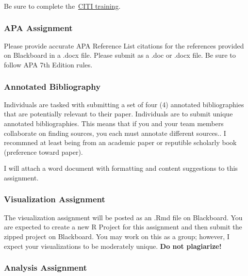 \documentclass[
  b5paper]{book}
\begin{document}
Be sure to complete the~\href{https://www.citiprogram.org/Shibboleth.sso/Login?target=https\%3A\%2F\%2Fwww.citiprogram.org\%2FSecure\%2FWelcome.cfm?inst=551\&entityID=https\%3A\%2F\%2Fsts.windows.net\%2F99f37d21-0b5c-43ea-9103-e16f02f5aecf\%2F}{CITI training}.

\hypertarget{apa-assignment}{%
\subsubsection*{APA Assignment}\label{apa-assignment}}

Please provide accurate APA Reference List citations for the references provided on Blackboard in a .docx file. Please submit as a .doc or .docx file. Be sure to follow APA 7th Edition rules.

\hypertarget{annotated-bibliography}{%
\subsubsection*{Annotated Bibliography}\label{annotated-bibliography}}

Individuals are tasked with submitting a set of four (4) annotated bibliographies that are potentially relevant to their paper. Individuals are to submit unique annotated bibliographies. This means that if you and your team members collaborate on finding sources, you each must annotate different sources.. I recommned at least being from an academic paper or reputible scholarly book (preference toward paper).

I will attach a word document with formatting and content suggestions to this assignment.

\hypertarget{visualization-assignment}{%
\subsubsection*{Visualization Assignment}\label{visualization-assignment}}

The visualization assignment will be posted as an .Rmd file on Blackboard. You are expected to create a new R Project for this assignment and then submit the zipped project on Blackboard. You may work on this as a group; however, I expect your visualizations to be moderately unique. \textbf{Do not plagiarize!}

\hypertarget{analysis-assignment}{%
\subsubsection*{Analysis Assignment}\label{analysis-assignment}}
\end{document}
